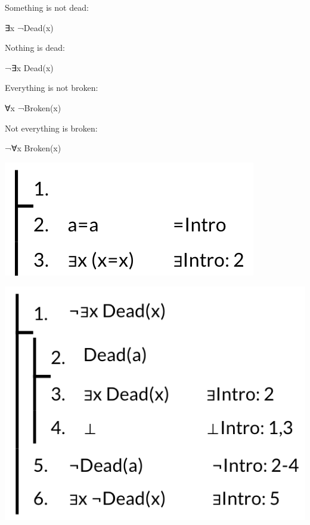 \documentclass[12pt]{extarticle}
\begin{document}
\begin{multicols*}{3}
Something is not dead:
 
\hspace{3mm} ∃x ¬Dead(x)
 
Nothing is dead:
 
\hspace{3mm} ¬∃x Dead(x)
 
Everything is not broken:
 
\hspace{3mm} ∀x ¬Broken(x)
 
Not everything is broken:
 
\hspace{3mm} ¬∀x Broken(x)
 
\begin{center}
\includegraphics[scale=0.3]{img/unit_605_prf1.png}
\end{center}
\begin{center}
\includegraphics[scale=0.3]{img/unit_605_prf2.png}
\end{center}
\begin{center}

\end{center}
\end{multicols*}
\end{document}
